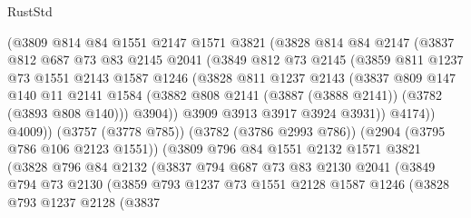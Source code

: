 \begin{lexlean}{RustStd}
\begin{coremodule}
                (@3809
                  @814
                  @84
                  @1551
                  @2147
                  @1571
                  @3821
                  (@3828
                    @814
                    @84
                    @2147
                    (@3837
                      @812
                      @687
                      @73
                      @83
                      @2145
                      @2041
                      (@3849
                        @812
                        @73
                        @2145
                        (@3859
                          @811
                          @1237
                          @73
                          @1551
                          @2143
                          @1587
                          @1246
                          (@3828
                            @811
                            @1237
                            @2143
                            (@3837
                              @809
                              @147
                              @140
                              @11
                              @2141
                              @1584
                              (@3882 @808 @2141 (@3887 (@3888 @2141)) (@3782 (@3893 @808 @140)))
                              @3904))
                          @3909
                          @3913
                          @3917
                          @3924
                          @3931))
                      @4174))
                  @4009))
              (@3757 (@3778 @785))
              (@3782 (@3786 @2993 @786))
              (@2904 (@3795 @786 @106 @2123 @1551))
              (@3809
                @796
                @84
                @1551
                @2132
                @1571
                @3821
                (@3828
                  @796
                  @84
                  @2132
                  (@3837
                    @794
                    @687
                    @73
                    @83
                    @2130
                    @2041
                    (@3849
                      @794
                      @73
                      @2130
                      (@3859
                        @793
                        @1237
                        @73
                        @1551
                        @2128
                        @1587
                        @1246
                        (@3828
                          @793
                          @1237
                          @2128
                          (@3837

\end{coremodule}
\end{lexlean}
